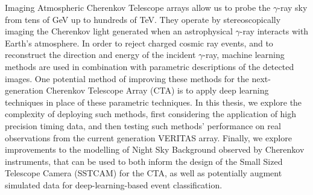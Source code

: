 Imaging Atmospheric Cherenkov Telescope arrays allow us to probe the $\gamma$-ray sky from tens of GeV up to hundreds of TeV. They operate by stereoscopically imaging the Cherenkov light generated when an astrophysical $\gamma$-ray interacts with Earth's atmosphere. In order to reject charged cosmic ray events, and to reconstruct the direction and energy of the incident $\gamma$-ray, machine learning methods are used in combination with parametric descriptions of the detected images. One potential method of improving these methods for the next-generation Cherenkov Telescope Array (CTA) is to apply deep learning techniques in place of these parametric techniques. In this thesis, we explore the complexity of deploying such methods, first considering the application of high precision timing data, and then testing such methods' performance on real observations from the current generation VERITAS array. Finally, we explore improvements to the modelling of Night Sky Background observed by Cherenkov instruments, that can be used to both inform the design of the Small Sized Telescope Camera (SSTCAM) for the CTA, as well as potentially augment simulated data for deep-learning-based event classification.